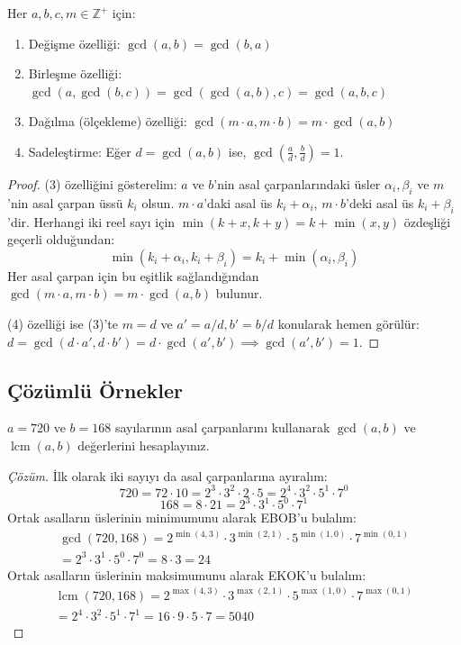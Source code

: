 \begin{theorem}
Her $a, b, c, m \in \mathbb{Z}^+$ için:
\begin{enumerate}
    \item Değişme özelliği: $\gcd(a, b) = \gcd(b, a)$
    \item Birleşme özelliği: $\gcd(a, \gcd(b, c)) = \gcd(\gcd(a, b), c) = \gcd(a, b, c)$
    \item Dağılma (ölçekleme) özelliği: $\gcd(m \cdot a, m \cdot b) = m \cdot \gcd(a, b)$
    \item Sadeleştirme: Eğer $d = \gcd(a, b)$ ise, $\gcd\left(\frac{a}{d}, \frac{b}{d}\right) = 1$.
\end{enumerate}
\end{theorem}

\begin{proof}
(3) özelliğini gösterelim: $a$ ve $b$'nin asal çarpanlarındaki üsler $\alpha_i, \beta_i$ ve $m$'nin asal çarpan üssü $k_i$ olsun.
$m \cdot a$'daki asal üs $k_i + \alpha_i$, $m \cdot b$'deki asal üs $k_i + \beta_i$'dir.
Herhangi iki reel sayı için $\min(k + x, k + y) = k + \min(x, y)$ özdeşliği geçerli olduğundan:
\[ \min(k_i + \alpha_i, k_i + \beta_i) = k_i + \min(\alpha_i, \beta_i) \]
Her asal çarpan için bu eşitlik sağlandığından $\gcd(m \cdot a, m \cdot b) = m \cdot \gcd(a, b)$ bulunur.

(4) özelliği ise (3)'te $m = d$ ve $a' = a/d, b' = b/d$ konularak hemen görülür: $d = \gcd(d \cdot a', d \cdot b') = d \cdot \gcd(a', b') \implies \gcd(a', b') = 1$.
\end{proof}

\subsection*{Çözümlü Örnekler}

\begin{example}
$a = 720$ ve $b = 168$ sayılarının asal çarpanlarını kullanarak $\gcd(a, b)$ ve $\operatorname{lcm}(a, b)$ değerlerini hesaplayınız.
\end{example}

\begin{proof}[Çözüm]
İlk olarak iki sayıyı da asal çarpanlarına ayıralım:
\[ 720 = 72 \cdot 10 = 2^3 \cdot 3^2 \cdot 2 \cdot 5 = 2^4 \cdot 3^2 \cdot 5^1 \cdot 7^0 \]
\[ 168 = 8 \cdot 21 = 2^3 \cdot 3^1 \cdot 5^0 \cdot 7^1 \]
Ortak asalların üslerinin minimumunu alarak EBOB'u bulalım:
\begin{multline*}
\gcd(720, 168) = 2^{\min(4, 3)} \cdot 3^{\min(2, 1)} \cdot 5^{\min(1, 0)} \cdot 7^{\min(0, 1)} \\
= 2^3 \cdot 3^1 \cdot 5^0 \cdot 7^0 = 8 \cdot 3 = 24
\end{multline*}
Ortak asalların üslerinin maksimumunu alarak EKOK'u bulalım:
\begin{multline*}
\operatorname{lcm}(720, 168) = 2^{\max(4, 3)} \cdot 3^{\max(2, 1)} \cdot 5^{\max(1, 0)} \cdot 7^{\max(0, 1)} \\
= 2^4 \cdot 3^2 \cdot 5^1 \cdot 7^1 = 16 \cdot 9 \cdot 5 \cdot 7 = 5040
\end{multline*}
\end{proof}

